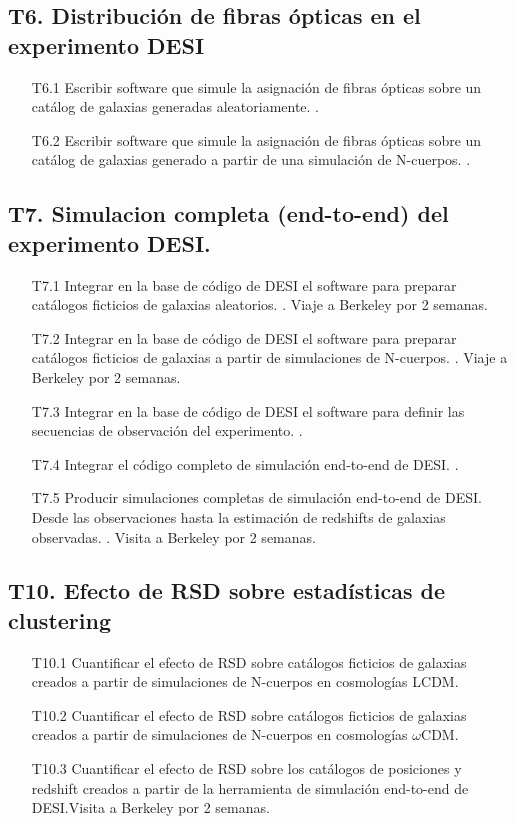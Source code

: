 \subsection*{T6. Distribuci\'on de fibras \'opticas en el experimento DESI}
\begin{itemize}
\item[T6.1] \prof Escribir software que simule la asignaci\'on de fibras
  \'opticas sobre un cat\'alog de galaxias generadas aleatoriamente.  \bob.
\item[T6.2] \prof Escribir software que simule la asignaci\'on de fibras
  \'opticas sobre un cat\'alog de galaxias generado a partir de una
  simulaci\'on de N-cuerpos. \bob.
\end{itemize}

\subsection*{T7. Simulacion completa (end-to-end) del experimento DESI.}
\begin{itemize}
\item[T7.1] \prof Integrar en la base de c\'odigo de DESI el software para
  preparar cat\'alogos ficticios de galaxias aleatorios. \bob. Viaje a Berkeley por 2 semanas. 
\item[T7.2] \gradA\prof Integrar en la base de c\'odigo de DESI el software para
  preparar cat\'alogos ficticios de galaxias a partir de simulaciones
  de N-cuerpos. \bob. Viaje a Berkeley por 2 semanas.
\item[T7.3] \prof Integrar en la base de c\'odigo de DESI el software para
  definir las secuencias de observaci\'on del experimento. \bob.
\item[T7.4] \prof Integrar el c\'odigo completo de simulaci\'on end-to-end
  de DESI. \bob. 
\item[T7.5] \prof Producir simulaciones completas de simulaci\'on end-to-end
  de DESI. Desde las observaciones hasta la estimaci\'on de redshifts
  de galaxias observadas. \bob. Visita a Berkeley por 2 semanas.
\end{itemize}



\subsection*{T10. Efecto de RSD sobre estad\'isticas de clustering}
\begin{itemize}
\item[T10.1] \gradB
  Cuantificar el efecto de RSD sobre cat\'alogos ficticios de
  galaxias creados a partir de simulaciones de N-cuerpos en
  cosmolog\'ias LCDM. 
\item[T10.2] \gradB Cuantificar el efecto de RSD sobre cat\'alogos ficticios de
  galaxias creados a partir de simulaciones de N-cuerpos en
  cosmolog\'ias $\omega$CDM. 
\item[T10.3] \gradB Cuantificar el efecto de RSD sobre los cat\'alogos de
  posiciones y redshift creados a partir de la herramienta de
  simulaci\'on end-to-end de DESI.\bob Visita a Berkeley por 2 semanas.
\end{itemize}


